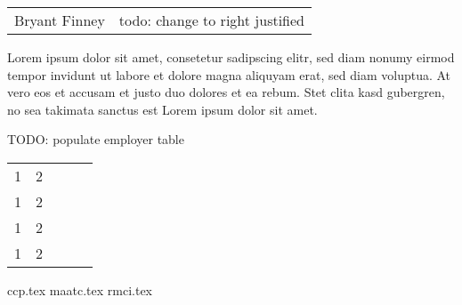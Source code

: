 \documentclass[10pt,a4paper]{article}
\begin{document}
\begin{table}
  \begin{tabular}{lr}
    {\noindent\Huge Bryant Finney}     &     todo: change to right justified
  \end{tabular}
\end{table}


Lorem ipsum dolor sit amet, consetetur sadipscing elitr, sed diam nonumy eirmod
tempor invidunt ut labore et dolore magna aliquyam erat, sed diam voluptua. At
vero eos et accusam et justo duo dolores et ea rebum. Stet clita kasd gubergren,
no sea takimata sanctus est Lorem ipsum dolor sit amet.

TODO: populate employer table
\begin{table}[h]
  \begin{tabular}{lllll}
    1 &  2         &          &  &  \\
    1 &  2         &          &  &  \\
    1 &  2         &          &  &  \\
    1 &  2         &          &  &
  \end{tabular}
\end{table}

{ccp.tex}
{maatc.tex}
{rmci.tex}
\end{document}
